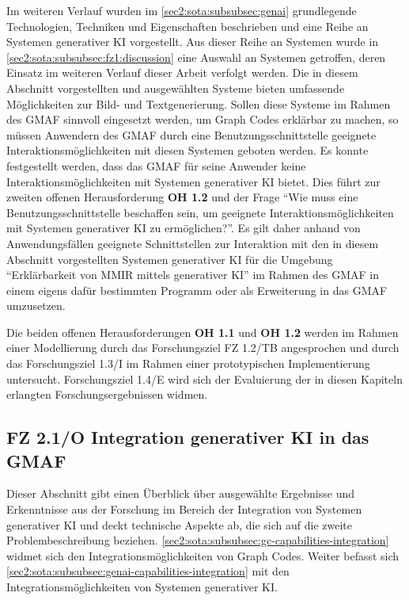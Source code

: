 Im weiteren Verlauf wurden im \cref{sec2:sota:subsubsec:genai} grundlegende Technologien, Techniken und Eigenschaften beschrieben und eine Reihe an Systemen generativer KI vorgestellt.
Aus dieser Reihe an Systemen wurde in \cref{sec2:sota:subsubsec:fz1:discussion} eine Auswahl an Systemen getroffen, deren Einsatz im weiteren Verlauf dieser Arbeit verfolgt werden.
Die in diesem Abschnitt vorgestellten und ausgewählten Systeme bieten umfassende Möglichkeiten zur Bild- und Textgenerierung.
Sollen diese Systeme im Rahmen des GMAF sinnvoll eingesetzt werden, um Graph Codes erklärbar zu machen, so müssen Anwendern des GMAF durch eine Benutzungsschnittstelle geeignete Interaktionsmöglichkeiten mit diesen Systemen geboten werden.
Es konnte festgestellt werden, dass das GMAF für seine Anwender keine Interaktionsmöglichkeiten mit Systemen generativer KI bietet.
Dies führt zur zweiten offenen Herausforderung \textbf{OH 1.2} und der Frage \enquote{Wie muss eine Benutzungsschnittstelle beschaffen sein, um geeignete Interaktionsmöglichkeiten mit Systemen generativer KI zu ermöglichen?}.
Es gilt daher anhand von Anwendungsfällen geeignete Schnittstellen zur Interaktion mit den in diesem Abschnitt vorgestellten Systemen generativer KI für die Umgebung \enquote{Erklärbarkeit von MMIR mittels generativer KI} im Rahmen des GMAF in einem eigens dafür bestimmten Programm oder als Erweiterung in das GMAF umzusetzen.

Die beiden offenen Herausforderungen \textbf{OH 1.1} und \textbf{OH 1.2} werden im Rahmen einer Modellierung durch das Forschungsziel FZ 1.2/TB angesprochen und durch das Forschungsziel 1.3/I im Rahmen einer prototypischen Implementierung untersucht.
Forschungsziel 1.4/E wird sich der Evaluierung der in diesen Kapiteln erlangten Forschungsergebnissen widmen.

\clearpage

\subsection{FZ 2.1/O Integration generativer KI in das GMAF}
\label{sec2:sota:subsec:fz-integration}
Dieser Abschnitt gibt einen Überblick über ausgewählte Ergebnisse und Erkenntnisse aus der Forschung im Bereich der Integration von Systemen generativer KI und deckt technische Aspekte ab, die sich auf die zweite Problembeschreibung beziehen.
\cref{sec2:sota:subsubsec:gc-capabilities-integration} widmet sich den Integrationsmöglichkeiten von Graph Codes.
Weiter befasst sich \cref{sec2:sota:subsubsec:genai-capabilities-integration} mit den Integrationsmöglichkeiten von Systemen generativer KI.

